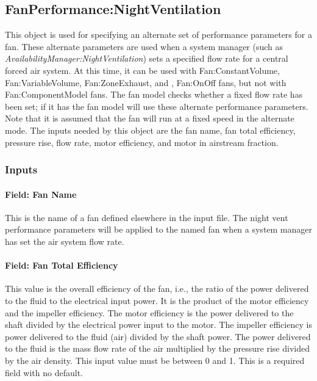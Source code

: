 \subsection{FanPerformance:NightVentilation}\label{fanperformancenightventilation}

This object is used for specifying an alternate set of performance parameters for a fan. These alternate parameters are used when a system manager (such as \emph{AvailabilityManager:NightVentilation}) sets a specified flow rate for a central forced air system. At this time, it can be used with Fan:ConstantVolume, Fan:VariableVolume, Fan:ZoneExhaust, and , Fan:OnOff fans, but not with Fan:ComponentModel fans. The fan model checks whether a fixed flow rate has been set; if it has the fan model will use these alternate performance parameters. Note that it is assumed that the fan will run at a fixed speed in the alternate mode. The inputs needed by this object are the fan name, fan total efficiency, pressure rise, flow rate, motor efficiency, and motor in airstream fraction.

\subsubsection{Inputs}\label{inputs-4-013}

\paragraph{Field: Fan Name}\label{field-fan-name-001}

This is the name of a fan defined elsewhere in the input file. The night vent performance parameters will be applied to the named fan when a system manager has set the air system flow rate.

\paragraph{Field: Fan Total Efficiency}\label{field-fan-total-efficiency-4}

This value is the overall efficiency of the fan, i.e., the ratio of the power delivered to the fluid to the electrical input power. It is the product of the motor efficiency and the impeller efficiency. The motor efficiency is the power delivered to the shaft divided by the electrical power input to the motor. The impeller efficiency is power delivered to the fluid (air) divided by the shaft power. The power delivered to the fluid is the mass flow rate of the air multiplied by the pressure rise divided by the air density. This input value must be between 0 and 1. This is a required field with no default.

